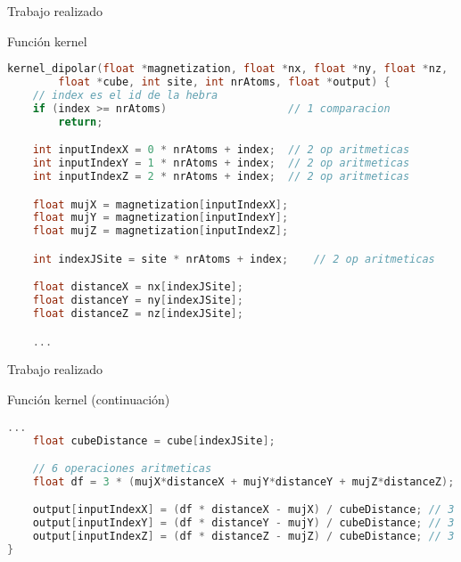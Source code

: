 \begin{frame}[fragile]{Trabajo realizado}
\begin{block}{Función kernel}

\begin{lstlisting}[language=C++, basicstyle=\tiny]
kernel_dipolar(float *magnetization, float *nx, float *ny, float *nz,
        float *cube, int site, int nrAtoms, float *output) {
    // index es el id de la hebra
    if (index >= nrAtoms)                   // 1 comparacion
        return;

    int inputIndexX = 0 * nrAtoms + index;  // 2 op aritmeticas
    int inputIndexY = 1 * nrAtoms + index;  // 2 op aritmeticas
    int inputIndexZ = 2 * nrAtoms + index;  // 2 op aritmeticas

    float mujX = magnetization[inputIndexX];
    float mujY = magnetization[inputIndexY];
    float mujZ = magnetization[inputIndexZ];

    int indexJSite = site * nrAtoms + index;    // 2 op aritmeticas

    float distanceX = nx[indexJSite];
    float distanceY = ny[indexJSite];
    float distanceZ = nz[indexJSite];

    ...
\end{lstlisting}

\end{block}
\end{frame}

\begin{frame}[fragile]{Trabajo realizado}
\begin{block}{Función kernel (continuación)}

\begin{lstlisting}[language=C++, basicstyle=\tiny]
	...
    float cubeDistance = cube[indexJSite];

    // 6 operaciones aritmeticas
    float df = 3 * (mujX*distanceX + mujY*distanceY + mujZ*distanceZ);

    output[inputIndexX] = (df * distanceX - mujX) / cubeDistance; // 3 op aritimeticas
    output[inputIndexY] = (df * distanceY - mujY) / cubeDistance; // 3 op aritimeticas
    output[inputIndexZ] = (df * distanceZ - mujZ) / cubeDistance; // 3 op aritimeticas
}
\end{lstlisting}

\end{block}
\end{frame}

